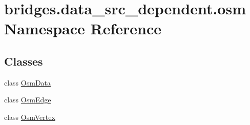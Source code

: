 \hypertarget{namespacebridges_1_1data__src__dependent_1_1osm}{}\section{bridges.\+data\+\_\+src\+\_\+dependent.\+osm Namespace Reference}
\label{namespacebridges_1_1data__src__dependent_1_1osm}
\subsection*{Classes}
\begin{DoxyCompactItemize}
\item 
class \mbox{\hyperlink{classbridges_1_1data__src__dependent_1_1osm_1_1_osm_data}{Osm\+Data}}
\item 
class \mbox{\hyperlink{classbridges_1_1data__src__dependent_1_1osm_1_1_osm_edge}{Osm\+Edge}}
\item 
class \mbox{\hyperlink{classbridges_1_1data__src__dependent_1_1osm_1_1_osm_vertex}{Osm\+Vertex}}
\end{DoxyCompactItemize}
